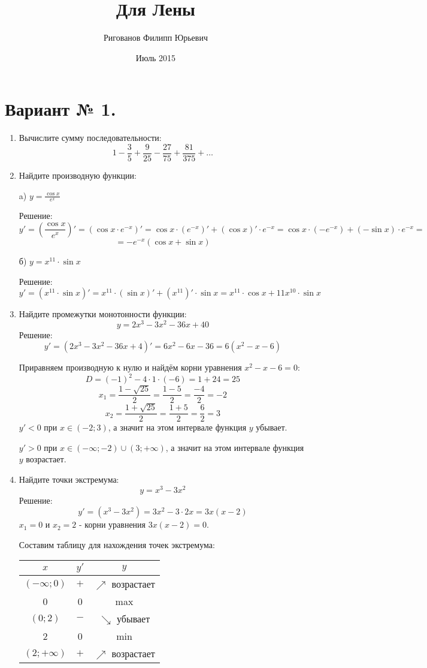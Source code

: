 \documentclass{article}
\title{Для Лены}
\author{Ригованов Филипп Юрьевич}
\date{Июль 2015}
\begin{document}
\maketitle
\section*{Вариант № 1.}
\begin{enumerate}

\item %
Вычислите сумму последовательности:
$$1-\frac{3}{5}+\frac{9}{25}-\frac{27}{75}+\frac{81}{375}+\ldots$$
\item %
Найдите производную функции:

a) $y=\frac{\cos{x}}{e^x}$

Решение:
$$y'=\left(\frac{\cos{x}}{e^x}\right)'=\left(\cos{x}\cdot e^{-x}\right)'=\cos{x}\cdot\left(e^{-x}\right)'+\left(\cos{x}\right)'\cdot e^{-x}=\cos{x}\cdot\left(-e^{-x}\right)+\left(-\sin{x}\right)\cdot e^{-x}=$$ $$=-e^{-x}\left(\cos{x}+\sin{x}\right)$$

б) $y=x^{11}\cdot\sin{x}$

Решение:
$$y'=\left(x^{11}\cdot\sin{x}\right)'=x^{11}\cdot\left(\sin{x}\right)'+\left(x^{11}\right)'\cdot\sin{x}=x^{11}\cdot\cos{x}+11x^{10}\cdot\sin{x}$$

\item %
Найдите промежутки монотонности функции:
$$y=2x^3-3x^2-36x+40$$
Решение:
$$y'=\left(2x^3-3x^2-36x+4\right)'=6x^2-6x-36=6\left(x^2-x-6\right)$$ %

Приравняем производную к нулю и найдём корни уравнения $x^2-x-6=0$:
$$D=(-1)^2-4\cdot1\cdot(-6)=1+24=25$$
$$x_1=\frac{1-\sqrt{25}}{2}=\frac{1-5}{2}=\frac{-4}{2}=-2$$
$$x_2=\frac{1+\sqrt{25}}{2}=\frac{1+5}{2}=\frac{6}{2}=3$$
$y'<0$ при $x\in\left(-2;3\right)$, а значит на этом интервале функция $y$ убывает.

$y'>0$ при $x\in\left(-\infty;-2\right)\cup\left(3;+\infty\right)$, а значит на этом интервале функция $y$ возрастает.

\item %
Найдите точки экстремума:
$$y=x^3-3x^2$$
Решение:
$$y'=\left(x^3-3x^2\right)=3x^2-3\cdot2x=3x(x-2)$$
$x_1=0$ и $x_2=2$ - корни уравнения $3x(x-2)=0$.

Составим таблицу для нахождения точек экстремума:

\begin{center}
\begin{tabular}{|c|c|c|}
\hline
$x$ & $y'$ & $y$ \\
\hline\hline
$\left(-\infty;0\right)$ & $+$ & $\nearrow$ возрастает \\
\hline
0 & 0 & max\\
\hline
$\left(0;2\right)$ & $-$ & $\searrow$ убывает\\
\hline
2 & 0 & min \\
\hline
$\left(2;+\infty\right)$ & $+$ & $\nearrow$ возрастает \\
\hline
\end{tabular}
\end{center}


\end{enumerate}
\end{document}
